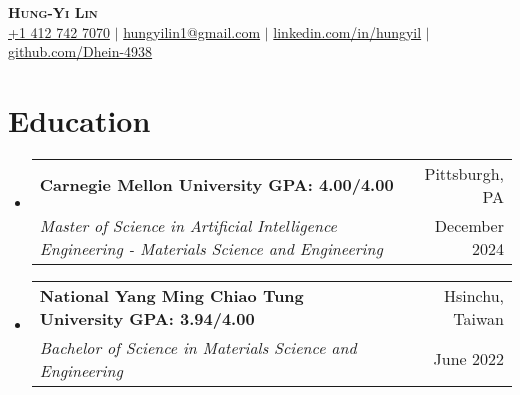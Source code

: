 \documentclass[a4paper,11pt]{article}
\makeatletter
\newcommand{\resumeDoubleHeading}[4]{
  \vspace{-2pt}\item
    \begin{tabular*}{0.97\textwidth}[t]{l@{\extracolsep{\fill}}r}
        \textbf{#1} & #2 \\
        \textit{\small#3} & {\small #4} \\
    \end{tabular*}\vspace{-8pt}
}
\newcommand{\resumeSubHeadingListStart}{\begin{itemize}[leftmargin=0.15in, label={}]}
\newcommand{\resumeSubHeadingListEnd}{\end{itemize}}
\makeatother
\begin{document}

\begin{center}
    \textbf{\Huge \scshape Hung-Yi Lin} \\ \vspace{3pt}
    \small
    \faMobile \hspace{.5pt} \href{tel:14127427070}{+1 412 742 7070}
    $|$
    \faAt \hspace{.5pt} \href{mailto:hungyilin1@gmail.com}{hungyilin1@gmail.com}
    $|$
    \faLinkedinSquare \hspace{.5pt} \href{https://www.linkedin.com/in/hungyil}{linkedin.com/in/hungyil}
    $|$
    \faGithub \hspace{.5pt} \href{https://github.com/Dhein-4938}{github.com/Dhein-4938}
\end{center}



\section{Education}
\resumeSubHeadingListStart
    \resumeDoubleHeading
      {Carnegie Mellon University \textnormal{\small GPA: 4.00/4.00}}{Pittsburgh, PA}
      {Master of Science in Artificial Intelligence Engineering - Materials Science and Engineering}{December 2024}
    \resumeDoubleHeading
      {National Yang Ming Chiao Tung University  \textnormal{\small GPA: 3.94/4.00}}{Hsinchu, Taiwan}
      {Bachelor of Science in Materials Science and Engineering}{June 2022} 
\resumeSubHeadingListEnd
\vspace{0pt}
\end{document}
